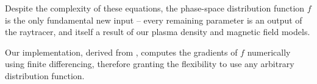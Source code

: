 Despite the complexity of these equations, the phase-space distribution function $f$ is the only fundamental new input -- every remaining parameter is an output of the raytracer, and itself a result of our plasma density and magnetic field models.

Our implementation, derived from \cite{Golden2010}, computes the gradients of $f$ numerically using finite differencing, therefore granting the flexibility to use any arbitrary distribution function.


